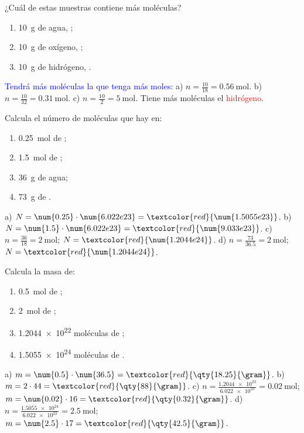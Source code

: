 \begin{exercise}
    ¿Cuál de estas muestras contiene más moléculas?
    \begin{enumerate}[label=\alph*)]
        \item \qty{10}{\gram} de agua, ;
        \item \qty{10}{\gram} de oxígeno, ;
        \item \qty{10}{\gram} de hidrógeno, .
    \end{enumerate}
    \begin{solu}
        \textcolor{blue}{Tendrá más moléculas la que tenga más moles:}
        a) \(n = \frac{10}{18} = \qty{0.56}{\mol}\). b) \(n = \frac{10}{32} = \qty{0.31}{\mol}\). c) \(n = \frac{10}{2} = \qty{5}{\mol}\). Tiene más moléculas el \textcolor{red}{hidrógeno}.
    \end{solu}
\end{exercise}

\begin{exercise}
    Calcula el número de moléculas que hay en:
    \begin{enumerate}[label=\alph*)]
        \item \qty{0.25}{\mol} de ;
        \item \qty{1.5}{\mol} de ;
        \item \qty{36}{\gram} de agua;
        \item \qty{73}{\gram} de .
    \end{enumerate}
    \begin{solu}
        a) \(N = \num{0.25} \cdot \num{6.022e23} = \textcolor{red}{\num{1.5055e23}}\). b) \(N = \num{1.5} \cdot \num{6.022e23} = \textcolor{red}{\num{9.033e23}}\). c) \(n = \frac{36}{18} = \qty{2}{\mol}\); \(N = \textcolor{red}{\num{1.2044e24}}\). d) \(n = \frac{73}{\num{36.5}} = \qty{2}{\mol}\); \(N = \textcolor{red}{\num{1.2044e24}}\).
    \end{solu}
\end{exercise}

\begin{exercise}
    Calcula la masa de:
    \begin{enumerate}[label=\alph*)]
        \item \qty{0.5}{\mol} de ;
        \item \qty{2}{\mol} de ;
        \item \num{1.2044e22} moléculas de ;
        \item \num{1.5055e24} moléculas de .
    \end{enumerate}
    \begin{solu}
        a) \(m = \num{0.5} \cdot \num{36.5} = \textcolor{red}{\qty{18.25}{\gram}}\). b) \(m = 2 \cdot 44 = \textcolor{red}{\qty{88}{\gram}}\).
        c) \(n = \frac{\num{1.2044e22}}{\num{6.022e23}} = \qty{0.02}{\mol}\); \(m = \num{0.02} \cdot 16 = \textcolor{red}{\qty{0.32}{\gram}}\).
        d) \(n = \frac{\num{1.5055e24}}{\num{6.022e23}} = \qty{2.5}{\mol}\); \(m = \num{2.5} \cdot 17 = \textcolor{red}{\qty{42.5}{\gram}}\).
    \end{solu}
\end{exercise}
